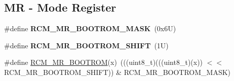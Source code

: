 \subsection*{MR -\/ Mode Register}
\begin{DoxyCompactItemize}
\item 
\mbox{\label{group___r_c_m___register___masks_gaeeffb6f7cab2ab8b9d66f7550dd53f66}} 
\#define {\bfseries R\+C\+M\+\_\+\+M\+R\+\_\+\+B\+O\+O\+T\+R\+O\+M\+\_\+\+M\+A\+SK}~(0x6\+U)
\item 
\mbox{\label{group___r_c_m___register___masks_ga958e658fc50cd077a2243ff6aa0548b6}} 
\#define {\bfseries R\+C\+M\+\_\+\+M\+R\+\_\+\+B\+O\+O\+T\+R\+O\+M\+\_\+\+S\+H\+I\+FT}~(1\+U)
\item 
\#define \mbox{\hyperlink{group___r_c_m___register___masks_ga7eb4795b893e54d190e79e2ef782d77d}{R\+C\+M\+\_\+\+M\+R\+\_\+\+B\+O\+O\+T\+R\+OM}}(x)~(((uint8\+\_\+t)(((uint8\+\_\+t)(x)) $<$$<$ R\+C\+M\+\_\+\+M\+R\+\_\+\+B\+O\+O\+T\+R\+O\+M\+\_\+\+S\+H\+I\+FT)) \& R\+C\+M\+\_\+\+M\+R\+\_\+\+B\+O\+O\+T\+R\+O\+M\+\_\+\+M\+A\+SK)
\end{DoxyCompactItemize}
